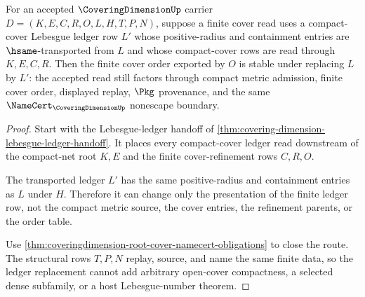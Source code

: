 \begin{theorem}
\label{thm:coveringdimension-lebesgue-ledger-stability}
For an accepted $\CoveringDimensionUp$ carrier $D=(K,E,C,R,O,L,H,T,P,N)$, suppose a finite cover read uses a compact-cover Lebesgue ledger row $L'$ whose positive-radius and containment entries are $\hsame$-transported from $L$ and whose compact-cover rows are read through $K,E,C,R$. Then the finite cover order exported by $O$ is stable under replacing $L$ by $L'$: the accepted read still factors through compact metric admission, finite cover order, displayed replay, $\Pkg$ provenance, and the same $\NameCert_{\CoveringDimensionUp}$ nonescape boundary.
\end{theorem}
\begin{proof}
Start with the Lebesgue-ledger handoff of \autoref{thm:covering-dimension-lebesgue-ledger-handoff}. It places every compact-cover ledger read downstream of the compact-net root $K,E$ and the finite cover-refinement rows $C,R,O$.

The transported ledger $L'$ has the same positive-radius and containment entries as $L$ under $H$. Therefore it can change only the presentation of the finite ledger row, not the compact metric source, the cover entries, the refinement parents, or the order table.

Use \autoref{thm:coveringdimension-root-cover-namecert-obligations} to close the route. The structural rows $T,P,N$ replay, source, and name the same finite data, so the ledger replacement cannot add arbitrary open-cover compactness, a selected dense subfamily, or a host Lebesgue-number theorem.
\end{proof}

